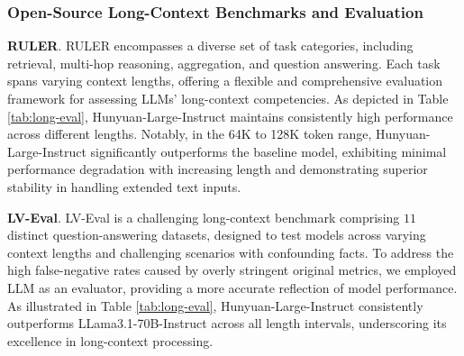 \documentclass{article}
\begin{document}
\subsubsection{Open-Source Long-Context Benchmarks and Evaluation}
\textbf{RULER}. RULER encompasses a diverse set of task categories, including retrieval, multi-hop reasoning, aggregation, and question answering. Each task spans varying context lengths, offering a flexible and comprehensive evaluation framework for assessing LLMs' long-context competencies. As depicted in Table \ref{tab:long-eval}, Hunyuan-Large-Instruct maintains consistently high performance across different lengths. Notably, in the 64K to 128K token range, Hunyuan-Large-Instruct significantly outperforms the baseline model, exhibiting minimal performance degradation with increasing length and demonstrating superior stability in handling extended text inputs.

\textbf{LV-Eval}. LV-Eval is a challenging long-context benchmark comprising $11$ distinct question-answering datasets, designed to test models across varying context lengths and challenging scenarios with confounding facts. To address the high false-negative rates caused by overly stringent original metrics, we employed LLM as an evaluator, providing a more accurate reflection of model performance. As illustrated in Table \ref{tab:long-eval}, Hunyuan-Large-Instruct consistently outperforms LLama3.1-70B-Instruct across all length intervals, underscoring its excellence in long-context processing. 

\begin{table}[!hbtp]
\centering
\caption{The performance of Hunyuan-Large-Instruct on RULER and LV-Eval.}
\label{tab:long-eval}
\end{table}
\end{document}
